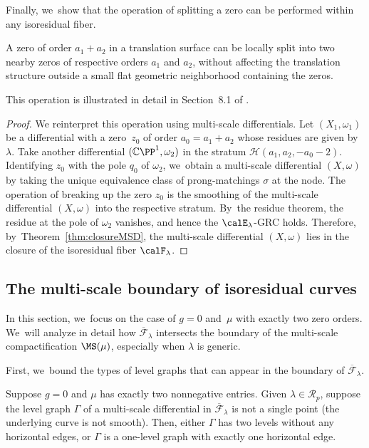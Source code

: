 Finally, we~show that the operation of splitting a zero can be performed within any isoresidual fiber.
\begin{cor}\label{cor:breakingup}
A zero of order $a_1+a_2$ in a translation surface can be locally split into two nearby zeros of respective orders $a_1$ and $a_2$, without affecting the translation structure outside a small flat geometric neighborhood containing the zeros.
\end{cor}
This operation is illustrated in detail in Section~8.1 of \cite{EMZ}.

\begin{proof}
We reinterpret this operation using multi-scale differentials.
Let $(X_{1},\omega_{1})$ be a differential with a zero~$z_{0}$ of order $a_0=a_{1}+a_{2}$ whose residues are given by $\lambda$. Take another differential $(\mathbb C\PP^1, \omega_2)$ in the stratum $\mathcal{H}(a_{1},a_{2},-a_0-2)$. Identifying $z_0$ with the pole $q_0$ of $\omega_{2}$, we~obtain a multi-scale differential $(X,\omega)$ by taking the unique equivalence class of prong-matchings $\sigma$ at the node. The operation of breaking up the zero $z_{0}$ is the smoothing of the multi-scale differential $(X,\omega)$ into the respective stratum. By~the residue theorem, the residue at the pole of $\omega_{2}$ vanishes, and hence the $\calE_{\lambda}$-GRC holds. Therefore, by~Theorem~\ref{thm:closureMSD}, the multi-scale differential $(X,\omega)$ lies in the closure of the isoresidual fiber $\calF_{\lambda}$.
\end{proof}

\subsection{The multi-scale boundary of isoresidual curves}\label{sub:boundary}

In this section, we~focus on the case of $g=0$ and~$\mu$ with exactly two zero orders. We~will analyze in detail how $\overline{\mathcal F}_\lambda$ intersects the boundary of the multi-scale compactification $\MS(\mu)$, especially when $\lambda$ is generic.

First, we~bound the types of level graphs that can appear in the boundary of $\overline{\mathcal F}_\lambda$.

\begin{lem}\label{lem:residues}
Suppose $g=0$ and $\mu$ has exactly two nonnegative entries. Given $\lambda\in \mathcal{R}_{p}$, suppose the level graph $\Gamma$ of a multi-scale differential in $\overline{\mathcal{F}}_{\lambda}$ is not a single point (\ie the underlying curve is not smooth). Then, either $\Gamma$ has two levels without any horizontal edges, or $\Gamma$ is a one-level graph with exactly one horizontal edge.
\end{lem}

